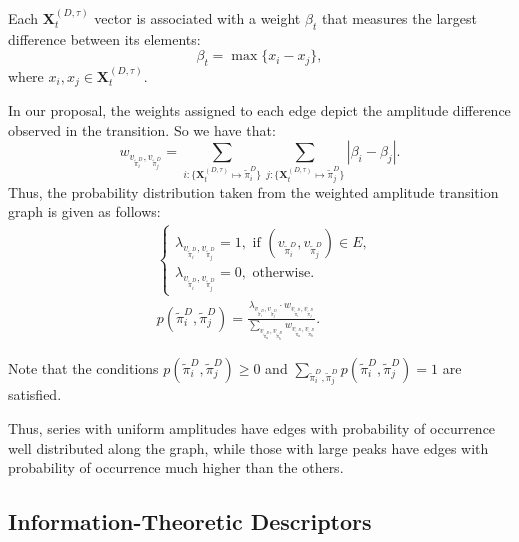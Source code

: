 \documentclass[journal]{IEEEtran}
\begin{document}
	
	Each $\mathbf{X}^{(D, \tau)}_t$ vector is associated with a weight $\beta_t$ that measures the largest difference between its elements:
	\begin{equation}
		\beta_t = \max\{x_i - x_j\},
	\end{equation}
	where $x_i, x_j \in \mathbf{X}^{(D, \tau)}_t$.
	
	In our proposal, the weights assigned to each edge depict the amplitude difference observed in the transition.
	So we have that:	
	\begin{equation}
		w_{v_{\widetilde \pi^D_i}, v_{\widetilde \pi^D_j}} =  \sum_{i : \{\mathbf{X}^{(D,\tau)}_t \mapsto \widetilde\pi^D_i\}} \sum_{j : \{\mathbf{X}^{(D,\tau)}_t \mapsto \widetilde\pi^D_j\}} |\beta_i - \beta_j| .
	\end{equation}
	Thus, the probability distribution taken from the weighted amplitude transition graph is given as follows:	
	\begin{align}
		&\left\{\begin{array}{l}
			\lambda_{v_{\widetilde\pi^D_i}, v_{\widetilde\pi^D_j}} = 1, \text{ if } (v_{\widetilde\pi^D_i}, v_{\widetilde\pi^D_j}) \in {E}, \\
			\lambda_{v_{\widetilde\pi^D_i}, v_{\widetilde\pi^D_j}} = 0, \text{ otherwise}.
		\end{array}\right. \\
		&p(\widetilde\pi^D_i, \widetilde\pi^D_j) = \frac{\lambda_{v_{\widetilde\pi^D_i}, v_{\widetilde\pi^D_j}} \cdot w_{v_{\widetilde\pi^D_i}, v_{\widetilde\pi^D_j}}}{\sum_{v_{\widetilde\pi^D_a}, v_{\widetilde\pi^D_b}} w_{v_{\widetilde\pi^D_a}, v_{\widetilde\pi^D_b}}}.
	\end{align}
	
	Note that the conditions $p(\widetilde\pi^D_i, \widetilde\pi^D_j) \ge 0$ and $\sum_{\widetilde\pi^D_i, \widetilde\pi^D_j} p(\widetilde\pi^D_i, \widetilde\pi^D_j) = 1$ are satisfied.
	
	Thus, series with uniform amplitudes have edges with probability of occurrence well distributed along the graph, while those with large peaks have edges with probability of occurrence much higher than the others.
	
	\subsection{Information-Theoretic Descriptors}\label{HC}
	
\end{document}
